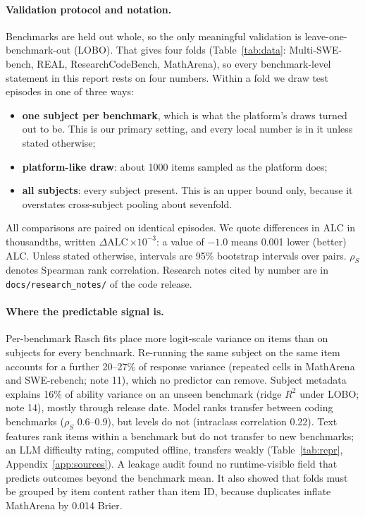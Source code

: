 \documentclass{article}
\newcommand{\dalc}{\ensuremath{\Delta\mathrm{ALC}}}
\newcommand{\ee}[1]{\ensuremath{\times 10^{-#1}}}
\newcommand{\rs}{\ensuremath{\rho_S}}
\begin{document}
\paragraph{Validation protocol and notation.} Benchmarks are held out whole, so the only meaningful validation is
leave-one-benchmark-out (LOBO). That gives four folds (Table~\ref{tab:data}: Multi-SWE-bench, REAL, ResearchCodeBench,
MathArena), so every benchmark-level statement in this report rests on four numbers. Within a fold we draw test
episodes in one of three ways:
\begin{itemize}[leftmargin=*,nosep]
  \item \textbf{one subject per benchmark}, which is what the platform's draws turned out to be. This is our primary
    setting, and every local number is in it unless stated otherwise;
  \item \textbf{platform-like draw}: about \num{1000} items sampled as the platform does;
  \item \textbf{all subjects}: every subject present. This is an upper bound only, because it overstates
    cross-subject pooling about sevenfold.
\end{itemize}
All comparisons are paired on identical episodes. We quote differences in ALC in thousandths, written
\dalc{}\,\ee{3}: a value of $-1.0$ means 0.001 lower (better) ALC. Unless stated otherwise, intervals are 95\%
bootstrap intervals over pairs. \rs{} denotes Spearman rank correlation. Research notes cited by number are in
\texttt{docs/research\_notes/} of the code release.

\paragraph{Where the predictable signal is.}
Per-benchmark Rasch fits place more logit-scale variance on items than on subjects for every benchmark. Re-running the
same subject on the same item accounts for a further 20--27\% of response variance (repeated cells in MathArena and
SWE-rebench; note 11), which no predictor can remove. Subject metadata explains 16\% of ability variance on an unseen
benchmark (ridge $R^2$ under LOBO; note 14), mostly through release date. Model ranks transfer between coding
benchmarks (\rs{} 0.6--0.9), but levels do not (intraclass correlation 0.22). Text features rank items within a
benchmark but do not transfer to new benchmarks; an LLM difficulty rating, computed offline, transfers weakly
(Table~\ref{tab:repr}, Appendix~\ref{app:sources}). A leakage audit found no runtime-visible field that predicts outcomes beyond the benchmark
mean. It also showed that folds must be grouped by item content rather than item ID, because duplicates inflate
MathArena by 0.014 Brier.
\end{document}

